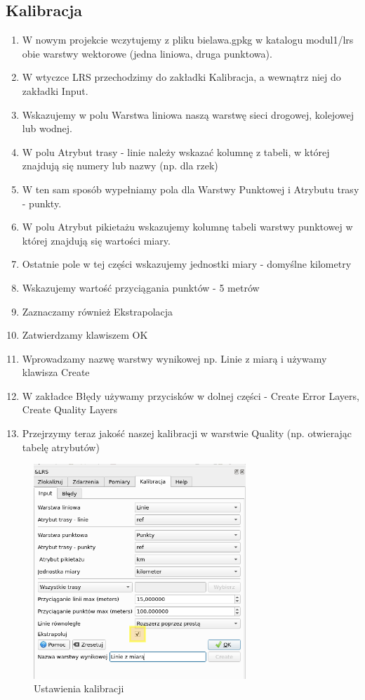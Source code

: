 \documentclass[a4paper,11pt, onecolumn, openany]{memoir}
\begin{document}
		\subsection{Kalibracja}
		\begin{enumerate}
			\item W nowym projekcie wczytujemy z pliku bielawa.gpkg w katalogu modul1/lrs obie warstwy wektorowe (jedna liniowa, druga punktowa).
			\item W wtyczce LRS przechodzimy do zakładki Kalibracja, a wewnątrz niej do zakładki Input.
			\item Wskazujemy w polu Warstwa liniowa naszą warstwę sieci drogowej, kolejowej lub wodnej.
			\item W polu Atrybut trasy - linie należy wskazać kolumnę z tabeli, w której znajdują się numery lub nazwy (np. dla rzek)
			\item W ten sam sposób wypełniamy pola dla Warstwy Punktowej i Atrybutu trasy - punkty.
			\item W polu Atrybut pikietażu wskazujemy kolumnę tabeli warstwy punktowej w której znajdują się wartości miary.
			\item Ostatnie pole w tej części wskazujemy jednostki miary - domyślne kilometry
			\item Wskazujemy wartość przyciągania punktów - 5 metrów
			\item Zaznaczamy również Ekstrapolacja
			\item Zatwierdzamy klawiszem OK
			\item Wprowadzamy nazwę warstwy wynikowej np. Linie z miarą i używamy klawisza Create
			\item W zakładce Błędy używamy przycisków w dolnej części - Create Error Layers, Create Quality Layers
			\item Przejrzymy teraz jakość naszej kalibracji w warstwie Quality (np. otwierając tabelę atrybutów)
		\end{enumerate}
			\begin{figure}[!ht]
		\centering
		\includegraphics[width=8cm]{lrs-kalibracja}
		\caption{Ustawienia kalibracji}
	\end{figure}
\end{document}
